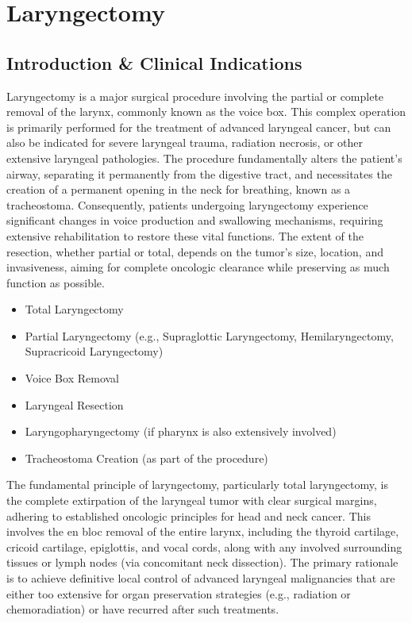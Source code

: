 \chapter{Laryngectomy}

\section*{Introduction \& Clinical Indications}
Laryngectomy is a major surgical procedure involving the partial or complete removal of the larynx, commonly known as the voice box. This complex operation is primarily performed for the treatment of advanced laryngeal cancer, but can also be indicated for severe laryngeal trauma, radiation necrosis, or other extensive laryngeal pathologies. The procedure fundamentally alters the patient's airway, separating it permanently from the digestive tract, and necessitates the creation of a permanent opening in the neck for breathing, known as a tracheostoma. Consequently, patients undergoing laryngectomy experience significant changes in voice production and swallowing mechanisms, requiring extensive rehabilitation to restore these vital functions. The extent of the resection, whether partial or total, depends on the tumor's size, location, and invasiveness, aiming for complete oncologic clearance while preserving as much function as possible.

\begin{itemize}
  \item Total Laryngectomy
  \item Partial Laryngectomy (e.g., Supraglottic Laryngectomy, Hemilaryngectomy, Supracricoid Laryngectomy)
  \item Voice Box Removal
  \item Laryngeal Resection
  \item Laryngopharyngectomy (if pharynx is also extensively involved)
  \item Tracheostoma Creation (as part of the procedure)
\end{itemize}

The fundamental principle of laryngectomy, particularly total laryngectomy, is the complete extirpation of the laryngeal tumor with clear surgical margins, adhering to established oncologic principles for head and neck cancer. This involves the en bloc removal of the entire larynx, including the thyroid cartilage, cricoid cartilage, epiglottis, and vocal cords, along with any involved surrounding tissues or lymph nodes (via concomitant neck dissection). The primary rationale is to achieve definitive local control of advanced laryngeal malignancies that are either too extensive for organ preservation strategies (e.g., radiation or chemoradiation) or have recurred after such treatments.

